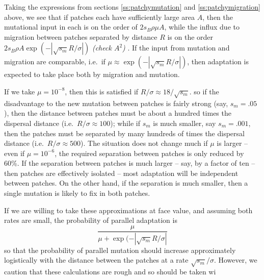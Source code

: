 \documentclass{article}
\newcommand{\gc}[1]{{ \it \color{green} (#1) } }
\begin{document}
Taking the expressions from sections \ref{ss:patchymutation} and \ref{ss:patchymigration} above,
we see that if patches each have sufficiently large area $A$,
then the mutational input in each is on the order of $2 s_B \rho \mu A$,
while the influx due to migration between patches separated by
distance $R$ is on the order $2 s_B \rho A \exp(- |\sqrt{s_m}
R/\sigma|)$ \gc{check $A^2$}. 
If the input from mutation and migration are comparable, i.e.\ if $\mu \approx \exp( -|\sqrt{s_m} R/\sigma| )$,
then adaptation is expected to take place both by migration and
mutation.



If we take $\mu = 10^{-8}$, then this is satisfied if $R/\sigma \approx 18/\sqrt{s_m}$.
so if the disadvantage to the new mutation between patches is fairly strong (say, $s_m=.05$),
then the distance between patches must be about a hundred times the dispersal distance (i.e.\ $R/\sigma \approx 100$);
while if $s_m$ is much smaller, say $s_m = .001$, 
then the patches must be separated by many hundreds of times the dispersal distance (i.e.\ $R/\sigma \approx 500$).
The situation does not change much if $\mu$ is larger -- even if $\mu = 10^{-6}$, 
the required separation between patches is only reduced by 60\%.
If the separation between patches is much larger -- say, by a factor of ten -- 
then patches are effectively isolated -- most adaptation will be independent between patches.
On the other hand, if the separation is much smaller, then a single
mutation is likely to fix in both patches.

If we are willing to take these approximations at face
value, and assuming both rates are small, the probability of parallel
adaptation is 
\begin{equation}
\frac{\mu}{\mu + \exp(- |\sqrt{s_m} R/\sigma|}
\end{equation}
so that the probability of parallel mutation should increase
approximately logistically with the distance between the patches at a
rate $\sqrt{s_m} /\sigma$. However, we caution that these calculations
are rough and so should be taken wi



\end{document}
